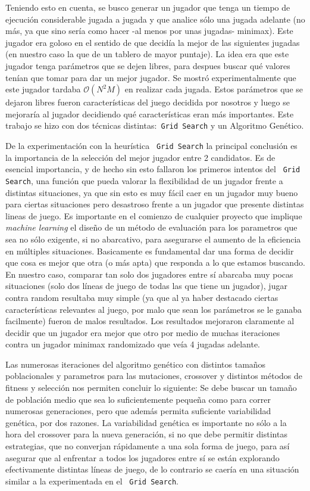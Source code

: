 \documentclass[A4paper,oneside,fleqn,11pt]{article}
\theoremstyle{definition}
\begin{document}
Teniendo esto en cuenta, se busco generar un jugador que tenga un tiempo de ejecución considerable jugada a jugada y que analice sólo una jugada adelante (no más, ya que sino sería como hacer -al menos por unas jugadas- minimax). Este jugador era goloso en el sentido de que decidía la mejor de las siguientes jugadas (en nuestro caso la que de un tablero de mayor puntaje). La idea era que este jugador tenga parámetros que se dejen libres, para despues buscar qué valores tenían que tomar para dar un mejor jugador. Se mostró experimentalmente que este jugador tardaba $\mathcal{O}(N^2M)$ en realizar cada jugada. Estos parámetros que se dejaron libres fueron características del juego decidida por nosotros y luego se mejoraría al jugador decidiendo qué características eran más importantes. Este trabajo se hizo con dos técnicas distintas:\texttt{ Grid Search} y un Algoritmo Genético.

De la experimentación con la heurística \texttt{ Grid Search} la principal conclusión es la importancia de la selección del mejor jugador entre 2 candidatos. Es de esencial importancia, y de hecho sin esto fallaron los primeros intentos del \texttt{ Grid Search}, una función que pueda valorar la flexibilidad de un jugador frente a distintas situaciones, ya que sin esto es muy fácil caer en un jugador muy bueno para ciertas situaciones pero desastroso frente a un jugador que presente distintas lineas de juego. Es importante en el comienzo de cualquier proyecto que implique \textit{machine learning} el diseño de un método de evaluación para los parametros que sea no sólo exigente, si no abarcativo, para asegurarse el aumento de la eficiencia en múltiples situaciones. Basicamente es fundamental dar una forma de decidir que cosa es mejor que otra (o más apta) que responda a lo que estamos buscando. En nuestro caso, comparar tan solo dos jugadores entre sí abarcaba muy pocas situaciones (solo dos líneas de juego de todas las que tiene un jugador), jugar contra random resultaba muy simple (ya que al ya haber destacado ciertas características relevantes al juego, por malo que sean los parámetros se le ganaba facilmente) fueron de malos resultados. Los resultados mejoraron claramente al decidir que un jugador era mejor que otro por medio de muchas iteraciones contra un jugador minimax randomizado que veía 4 jugadas adelante.

Las numerosas iteraciones del algoritmo genético con distintos tamaños poblacionales y parametros para las mutaciones, crossover y distintos métodos de fitness y selección nos permiten concluir lo siguiente: Se debe buscar un tamaño de población medio que sea lo suficientemente pequeña como para correr numerosas generaciones, pero que además permita suficiente variabilidad genética, por dos razones. La variabilidad genética es importante no sólo a la hora del crossover para la nueva generación, si no que debe permitir distintas estrategias, que no converjan rápidamente a una sola forma de juego, para así asegurar que al enfrentar a todos los jugadores entre sí se están explorando efectivamente distintas líneas de juego, de lo contrario se caería en una situación similar a la experimentada en el \texttt{ Grid Search}.
\end{document}
